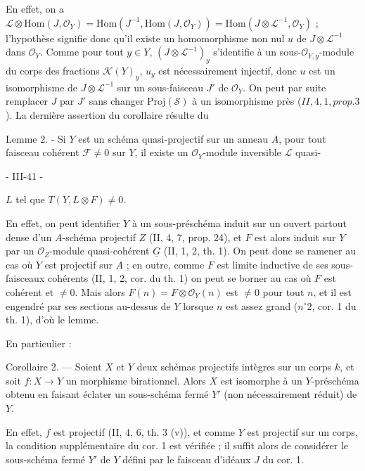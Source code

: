En effet, on a $\mathcal{L} \otimes \text{Hom}(J, \mathcal{O}_Y) = \text{Hom}(J^{-1}, \text{Hom}(J, \mathcal{O}_Y)) = \text{Hom}(J \otimes \mathcal{L}^{-1}, \mathcal{O}_Y)$ ; l'hypothèse signifie donc qu'il existe un homomorphisme non nul $u$ de $J \otimes \mathcal{L}^{-1}$ dans $\mathcal{O}_Y$. Comme pour tout $y \in Y$, $(J \otimes \mathcal{L}^{-1})_y$ s'identifie à un sous-$\mathcal{O}_{Y,y}$-module du corps des fractions $\mathcal{K}(Y)_y$, $u_y$ est nécessairement injectif, donc $u$ est un isomorphisme de $J \otimes \mathcal{L}^{-1}$ sur un sous-faisceau $J'$ de $\mathcal{O}_Y$. On peut par suite remplacer $J$ par $J'$ sans changer $\text{Proj}(\mathcal{S})$ à un isomorphisme près ($II, 4, 1, prop. 3$). La dernière assertion du corollaire résulte du

Lemme 2. - Si $Y$ est un schéma quasi-projectif sur un anneau $A$, pour tout faisceau cohérent $\mathcal{F} \neq 0$ sur $Y$, il existe un $\mathcal{O}_Y$-module inversible $\mathcal{L}$ quasi-

\newpage


- III-41 -

$L$ tel que $T(Y, L \otimes F) \neq 0$.

En effet, on peut identifier $Y$ à un sous-préschéma induit sur un ouvert partout dense d'un $A$-schéma projectif $Z$ (II, 4, 7, prop. 24), et $F$ est alors induit sur $Y$ par un $\mathcal{O}_Z$-module quasi-cohérent $\underline{G}$ (II, 1, 2, th. 1). On peut donc se ramener au cas où $Y$ est projectif sur $A$ ; en outre, comme $F$ est limite inductive de ses sous-faisceaux cohérents (II, 1, 2, cor. du th. 1) on peut se borner au cas où $F$ est cohérent et $\neq 0$. Mais alors $F(n) = F \otimes \mathcal{O}_Y(n)$ est $\neq 0$ pour tout $n$, et il est engendré par ses sections au-dessus de $Y$ lorsque $n$ est assez grand ($n^\circ 2$, cor. 1 du th. 1), d'où le lemme.

En particulier :

Corollaire 2. — Soient $X$ et $Y$ deux schémas projectifs intègres sur un corps $k$, et soit $f: X \to Y$ un morphisme birationnel. Alors $X$ est isomorphe à un $Y$-préschéma obtenu en faisant éclater un sous-schéma fermé $Y'$ (non nécessairement réduit) de $Y$.

En effet, $f$ est projectif (II, 4, 6, th. 3 (v)), et comme $Y$ est projectif sur un corps, la condition supplémentaire du cor. 1 est vérifiée ; il suffit alors de considérer le sous-schéma fermé $Y'$ de $Y$ défini par le faisceau d'idéaux $J$ du cor. 1.

